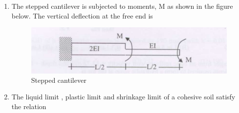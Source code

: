 \documentclass[journal]{IEEEtran}
\begin{document}
\begin{enumerate}
\begin{enumerate}
\end{enumerate}

\item The stepped cantilever is subjected to moments, M as shown in the figure below. The vertical deflection at the free end  is \hfill {}

\begin{figure}[H]
    \centering
    \includegraphics[width=0.6\columnwidth]{figs/fig3.png} 
    \caption{Stepped cantilever}
    \label{fig:placeholder}
\end{figure}
\begin{enumerate}
\end{enumerate}

\item The liquid limit , plastic limit  and shrinkage limit  of a cohesive soil satisfy the relation \hfill {}

\begin{enumerate}
\end{enumerate}


\end{enumerate}
\end{document}
